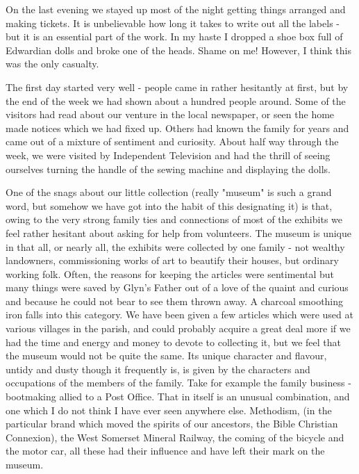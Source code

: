 On the last evening we stayed up most of the night getting things arranged and making tickets. It is unbelievable how long it takes to write out all the labels - but it is an essential part of the work. In my haste I dropped a shoe box full of Edwardian dolls and broke one of the heads. Shame on me! However, I think this was the only casualty.

The first day started very well - people came in rather hesitantly at first, but by the end of the week we had shown about a hundred people around. Some of the visitors had read about our venture in the local newspaper, or seen the home made notices which we had fixed up. Others had known the family for years and came out of a mixture of sentiment and curiosity. About half way through the week, we were visited by Independent Television and had the thrill of seeing ourselves turning the handle of the sewing machine and displaying the dolls.

One of the snags about our little collection (really "museum" is such a grand word, but somehow we have got into the habit of this designating it) is that, owing to the very strong family ties and connections of most of the exhibits we feel rather hesitant about asking for help from volunteers. The museum is unique in that all, or nearly all, the exhibits were collected by one family - not wealthy landowners, commissioning works of art to beautify their houses, but ordinary working folk. Often, the reasons for keeping the articles were sentimental but many things were saved by Glyn's Father out of a love of the quaint and curious and because he could not bear to see them thrown away. A charcoal smoothing iron falls into this category. We have been given a few articles which were used at various villages in the parish, and could probably acquire a great deal more if we had the time and energy and money to devote to collecting it, but we feel that the museum would not be quite the same. Its unique character and flavour, untidy and dusty though it frequently is, is given by the characters and occupations of the members of the family. Take for example the family business - bootmaking allied to a Post Office. That in itself is an unusual combination, and one which I do not think I have ever seen anywhere else. Methodism, (in the particular brand which moved the spirits of our ancestors, the Bible Christian Connexion), the West Somerset Mineral Railway, the coming of the bicycle and the motor car, all these had their influence and have left their mark on the museum.


